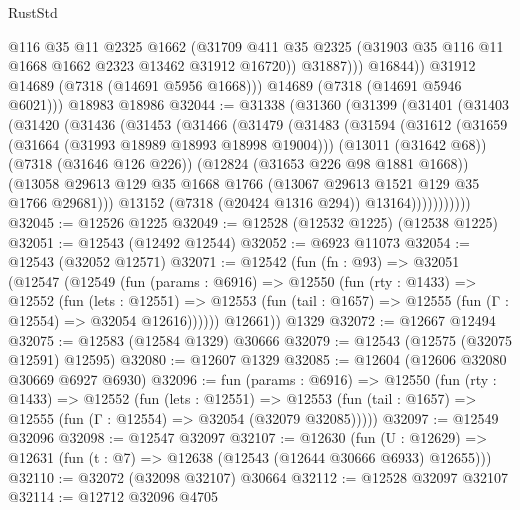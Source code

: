 \begin{lexlean}{RustStd}
\begin{coremodule}
                  @116
                  @35
                  @11
                  @2325
                  @1662
                  (@31709
                    @411
                    @35
                    @2325
                    (@31903 @35 @116 @11 @1668 @1662 @2323 @13462 @31912 @16720))
                  @31887)))
            @16844))
        @31912
        @14689
        (@7318 (@14691 @5956 @1668)))
      @14689
      (@7318 (@14691 @5946 @6021)))
    @18983
    @18986
@32044 := @31338
    (@31360
      (@31399
        (@31401
          (@31403
            (@31420
              (@31436
                (@31453
                  (@31466
                    (@31479
                      (@31483
                        (@31594
                          (@31612
                            (@31659 (@31664 (@31993 @18989 @18993 @18998 @19004)))
                            (@13011 (@31642 @68))
                            (@7318 (@31646 @126 @226))
                            (@12824 (@31653 @226 @98 @1881 @1668))
                            (@13058
                              @29613
                              @129
                              @35
                              @1668
                              @1766
                              (@13067 @29613 @1521 @129 @35 @1766 @29681)))
                          @13152
                          (@7318 (@20424 @1316 @294))
                          @13164)))))))))))
@32045 := @12526 @1225
@32049 := @12528 (@12532 @1225) (@12538 @1225)
@32051 := @12543 (@12492 @12544)
@32052 := @6923 @11073
@32054 := @12543 (@32052 @12571)
@32071 := @12542
    (fun (fn : @93) =>
    @32051
      (@12547
        (@12549
          (fun (params : @6916) =>
          @12550
            (fun (rty : @1433) =>
            @12552
              (fun (lets : @12551) =>
              @12553 (fun (tail : @1657) => @12555 (fun (Γ : @12554) => @32054 @12616))))))
        @12661))
    @1329
@32072 := @12667 @12494
@32075 := @12583 (@12584 @1329) @30666
@32079 := @12543 (@12575 (@32075 @12591) @12595)
@32080 := @12607 @1329
@32085 := @12604 (@12606 @32080 @30669 @6927 @6930)
@32096 := fun (params : @6916) =>
  @12550
    (fun (rty : @1433) =>
    @12552
      (fun (lets : @12551) =>
      @12553 (fun (tail : @1657) => @12555 (fun (Γ : @12554) => @32054 (@32079 @32085)))))
@32097 := @12549 @32096
@32098 := @12547 @32097
@32107 := @12630
    (fun (U : @12629) => @12631 (fun (t : @7) => @12638 (@12543 (@12644 @30666 @6933) @12655)))
@32110 := @32072 (@32098 @32107) @30664
@32112 := @12528 @32097 @32107
@32114 := @12712 @32096 @4705

\end{coremodule}
\end{lexlean}
